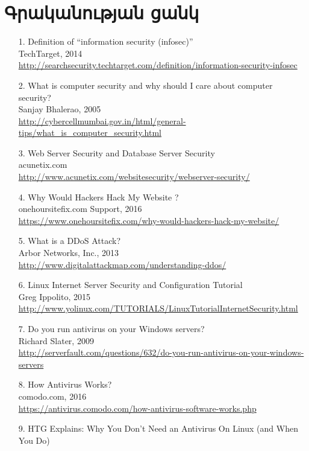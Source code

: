 \documentclass[a4paper,12pt]{article}
\begin{document}
\begin{sloppypar}
\section*{Գրականության ցանկ}
\begin{enumerate}
\item [1.] Definition of ``information security (infosec)'' \\
	TechTarget, 2014 \\
	\url{http://searchsecurity.techtarget.com/definition/information-security-infosec}
\item [2.] What is computer security and why should I care about computer security? \\
	Sanjay Bhalerao, 2005 \\ 
	\url{http://cybercellmumbai.gov.in/html/general-tips/what\_is\_computer\_security.html}
\item [3.] Web Server Security and Database Server Security \\ 
	acunetix.com \\
	\url{http://www.acunetix.com/websitesecurity/webserver-security/}
\item [4.] Why Would Hackers Hack My Website ? \\ 
	onehoursitefix.com Support, 2016 \\
	\url{https://www.onehoursitefix.com/why-would-hackers-hack-my-website/}
\item [5.] What is a DDoS Attack? \\ 
	Arbor Networks, Inc., 2013 \\
	\url{http://www.digitalattackmap.com/understanding-ddos/}
\item [6.] Linux Internet Server Security and Configuration Tutorial \\ 
	Greg Ippolito, 2015 \\
	\url{http://www.yolinux.com/TUTORIALS/LinuxTutorialInternetSecurity.html}
\item [7.] Do you run antivirus on your Windows servers? \\ 
	Richard Slater, 2009 \\
	\url{http://serverfault.com/questions/632/do-you-run-antivirus-on-your-windows-servers}
\item [8.] How Antivirus Works? \\ 
	comodo.com, 2016 \\
	\url{https://antivirus.comodo.com/how-antivirus-software-works.php}
\item [9.] HTG Explains: Why You Don’t Need an Antivirus On Linux (and When You Do) \\ 

\end{enumerate}
\end{sloppypar}
\end{document}
